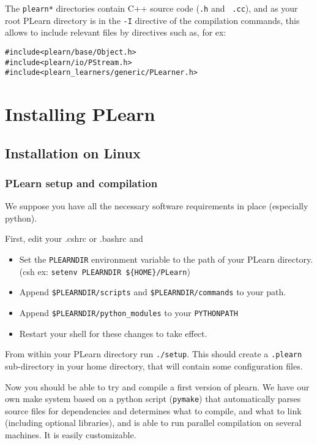 \documentclass[11pt]{book}
\begin{document}
The \verb!plearn*! directories contain C++ source code ({\tt .h} and {\tt
  .cc}), and as your root PLearn directory is in the \verb!-I! directive of
the compilation commands, this allows to include relevant files by
directives such as, for ex:
\begin{verbatim}
#include<plearn/base/Object.h>
#include<plearn/io/PStream.h>
#include<plearn_learners/generic/PLearner.h>
\end{verbatim}



\chapter{Installing PLearn}

\section{Installation on Linux}

\subsection{PLearn setup and compilation}

We suppose you have all the necessary software requirements in place (especially python).

First, edit your .cshrc or .bashrc and 
\begin{itemize}
\item Set the {\tt PLEARNDIR} environment variable to the path of your PLearn directory. 
(csh ex: \verb!setenv PLEARNDIR ${HOME}/PLearn!)
\item Append \verb!$PLEARNDIR/scripts! and \verb!$PLEARNDIR/commands! to your path.
\item Append \verb!$PLEARNDIR/python_modules! to your \verb!PYTHONPATH!
\item Restart your shell for these changes to take effect.
\end{itemize}

From within your PLearn directory run {\tt ./setup}. This should create a
{\tt .plearn} sub-directory in your home directory, that will contain some
configuration files.

Now you should be able to try and compile a first version of plearn.
We have our own make system based on a python script ({\tt pymake}) that
automatically parses source files for dependencies and determines what to
compile, and what to link (including optional libraries), and is able to
run parallel compilation on several machines.  It is easily
customizable.
\end{document}
